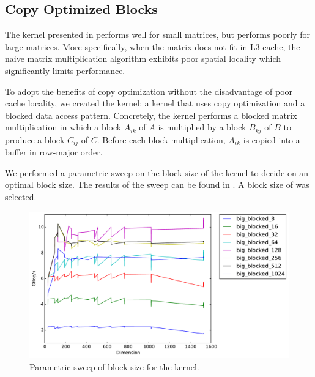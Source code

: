 \subsection{Copy Optimized Blocks}
The  kernel presented in  performs well for small
matrices, but performs poorly for large matrices. More specifically, when the
matrix does not fit in L3 cache, the naive matrix multiplication algorithm
exhibits poor spatial locality which significantly limits performance.

To adopt the benefits of copy optimization without the disadvantage of poor
cache locality, we created the  kernel: a kernel that uses
copy optimization and a blocked data access pattern. Concretely, the
 kernel performs a blocked matrix multiplication in which a
block $A_{ik}$ of $A$ is multiplied by a block $B_{kj}$ of $B$ to produce a
block $C_{ij}$ of $C$. Before each block multiplication, $A_{ik}$ is copied
into a buffer in row-major order.

We performed a parametric sweep on the block size of the 
kernel to decide on an optimal block size. The results of the sweep can be
found in . A block size of  was selected.

\begin{figure}[h]
  \centering
  \includegraphics[width=\textwidth]{img/timing_big_block_sweep.pdf}
  \caption{Parametric sweep of block size for the  kernel.}
  \label{fig:block-sweep}
\end{figure}
